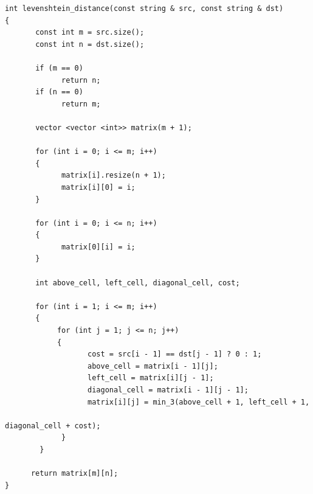 \documentclass{article}
\begin{document}
\begin{verbatim}
int levenshtein_distance(const string & src, const string & dst)
{
       const int m = src.size();
       const int n = dst.size();

       if (m == 0)
             return n;
       if (n == 0)
             return m;

       vector <vector <int>> matrix(m + 1);

       for (int i = 0; i <= m; i++)
       {
             matrix[i].resize(n + 1);
             matrix[i][0] = i;
       }

       for (int i = 0; i <= n; i++)
       {
             matrix[0][i] = i;
       }

       int above_cell, left_cell, diagonal_cell, cost;

       for (int i = 1; i <= m; i++)
       {
            for (int j = 1; j <= n; j++)
            {
                   cost = src[i - 1] == dst[j - 1] ? 0 : 1;
                   above_cell = matrix[i - 1][j];
                   left_cell = matrix[i][j - 1];
                   diagonal_cell = matrix[i - 1][j - 1];
                   matrix[i][j] = min_3(above_cell + 1, left_cell + 1,
                                                          diagonal_cell + cost);
             }
        }

      return matrix[m][n];
}
\end{verbatim}
\end{document}
